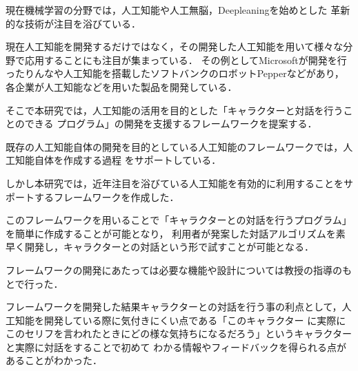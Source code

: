 %
現在機械学習の分野では，人工知能や人工無脳，Deepleaningを始めとした
革新的な技術が注目を浴びている．

現在人工知能を開発するだけではなく，その開発した人工知能を用いて様々な分野で応用することにも注目が集まっている．
その例としてMicrosoftが開発を行ったりんなや人工知能を搭載したソフトバンクのロボットPepperなどがあり，
各企業が人工知能などを用いた製品を開発している．

そこで本研究では，人工知能の活用を目的とした「キャラクターと対話を行うことのできる
プログラム」の開発を支援するフレームワークを提案する．

既存の人工知能自体の開発を目的としている人工知能のフレームワークでは，人工知能自体を作成する過程
をサポートしている．

しかし本研究では，近年注目を浴びている人工知能を有効的に利用することをサポートするフレームワークを作成した．

このフレームワークを用いることで「キャラクターとの対話を行うプログラム」を簡単に作成することが可能となり，
利用者が発案した対話アルゴリズムを素早く開発し，キャラクターとの対話という形で試すことが可能となる．

フレームワークの開発にあたっては必要な機能や設計については教授の指導のもとで行った．

フレームワークを開発した結果キャラクターとの対話を行う事の利点として，人工知能を開発している際に気付きにくい点である「このキャラクター
に実際にこのセリフを言われたときにどの様な気持ちになるだろう」というキャラクターと実際に対話をすることで初めて
わかる情報やフィードバックを得られる点があることがわかった．
